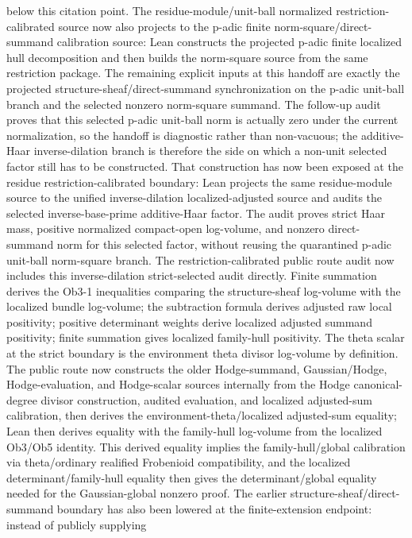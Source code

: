 \documentclass[11pt]{article}
\theoremstyle{plain}
\theoremstyle{definition}
\theoremstyle{remark}
\begin{document}
below this citation point.
The residue-module/unit-ball normalized restriction-calibrated source now also
projects to the p-adic finite norm-square/direct-summand calibration source:
Lean constructs the projected p-adic finite localized hull decomposition and
then builds the norm-square source from the same restriction package.  The
remaining explicit inputs at this handoff are exactly the projected
structure-sheaf/direct-summand synchronization on the p-adic unit-ball branch
and the selected nonzero norm-square summand.  The follow-up audit proves that
this selected p-adic unit-ball norm is actually zero under the current
normalization, so the handoff is diagnostic rather than non-vacuous; the
additive-Haar inverse-dilation branch is therefore the side on which a
non-unit selected factor still has to be constructed.
That construction has now been exposed at the residue restriction-calibrated
boundary: Lean projects the same residue-module source to the unified
inverse-dilation localized-adjusted source and audits the selected
inverse-base-prime additive-Haar factor.  The audit proves strict Haar mass,
positive normalized compact-open log-volume, and nonzero direct-summand norm
for this selected factor, without reusing the quarantined p-adic unit-ball
norm-square branch.  The restriction-calibrated public route audit now includes
this inverse-dilation strict-selected audit directly.
Finite summation derives the Ob3-1 inequalities
comparing the structure-sheaf log-volume with the localized bundle log-volume;
the subtraction formula derives adjusted raw local positivity; positive
determinant weights derive localized adjusted summand positivity; finite
summation gives localized family-hull positivity.  The theta scalar at the
strict boundary is the environment theta divisor log-volume by definition.  The
public route now constructs the older Hodge-summand, Gaussian/Hodge,
Hodge-evaluation, and Hodge-scalar sources internally from the Hodge
canonical-degree divisor construction, audited evaluation, and localized
adjusted-sum calibration, then derives the environment-theta/localized
adjusted-sum equality; Lean then derives
equality with the family-hull log-volume from the localized Ob3/Ob5 identity.  This derived
equality implies the family-hull/global calibration via theta/ordinary
realified Frobenioid compatibility, and the localized determinant/family-hull
equality then gives the determinant/global equality needed for the
Gaussian-global nonzero proof.  The earlier
  structure-sheaf/direct-summand boundary has also been lowered at the
  finite-extension endpoint: instead of publicly supplying
\end{document}
